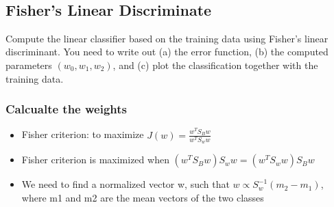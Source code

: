 \documentclass[11pt]{article}
\providecommand{\tightlist}{%
      \setlength{\itemsep}{0pt}\setlength{\parskip}{0pt}}
\begin{document}
    \begin{center}
    \end{center}
    { \hspace*{\fill} \\}
    
    \subsection{Fisher's Linear
Discriminate}\label{fishers-linear-discriminate}

Compute the linear classifier based on the training data using Fisher's
linear discriminant. You need to write out (a) the error function, (b)
the computed parameters \((w_0 , w_1 , w_2)\), and (c) plot the
classification together with the training data.

    \subsubsection{Calcualte the weights}\label{calcualte-the-weights}

\begin{itemize}
\tightlist
\item
  Fisher criterion: to maximize \(J(w) = \frac{w^{T}S_B w}{w^{T}S_w w}\)
\item
  Fisher criterion is maximized when
  \((w^T S_B w)S_w w = (w^T S_w w)S_B w\)
\item
  We need to find a normalized vector w, such that
  \(w \propto S^{-1}_w (m_2 - m_1)\), where m1 and m2 are the mean
  vectors of the two classes
\end{itemize}
\end{document}
